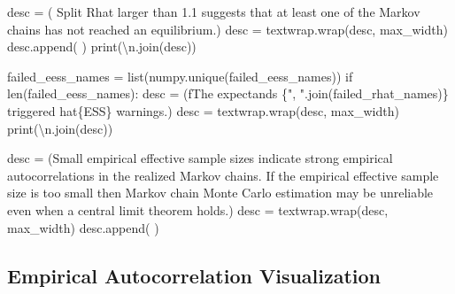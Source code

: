 \documentclass[
  letterpaper,
  DIV=11,
  numbers=noendperiod]{scrartcl}
\newenvironment{Shaded}{\begin{snugshade}}{\end{snugshade}}
\newcommand{\BuiltInTok}[1]{\textcolor[rgb]{0.00,0.23,0.31}{#1}}
\newcommand{\CharTok}[1]{\textcolor[rgb]{0.13,0.47,0.30}{#1}}
\newcommand{\ControlFlowTok}[1]{\textcolor[rgb]{0.00,0.23,0.31}{#1}}
\newcommand{\NormalTok}[1]{\textcolor[rgb]{0.00,0.23,0.31}{#1}}
\newcommand{\OperatorTok}[1]{\textcolor[rgb]{0.37,0.37,0.37}{#1}}
\newcommand{\SpecialCharTok}[1]{\textcolor[rgb]{0.37,0.37,0.37}{#1}}
\newcommand{\SpecialStringTok}[1]{\textcolor[rgb]{0.13,0.47,0.30}{#1}}
\newcommand{\StringTok}[1]{\textcolor[rgb]{0.13,0.47,0.30}{#1}}
\begin{document}
\begin{Shaded}
\begin{Highlighting}[]
\NormalTok{    desc }\OperatorTok{=}\NormalTok{ (}\StringTok{\textquotesingle{}  Split Rhat larger than 1.1 suggests that at \textquotesingle{}}
            \StringTok{\textquotesingle{}least one of the Markov chains has not reached \textquotesingle{}}
            \StringTok{\textquotesingle{}an equilibrium.\textquotesingle{}}\NormalTok{)}
\NormalTok{    desc }\OperatorTok{=}\NormalTok{ textwrap.wrap(desc, max\_width)}
\NormalTok{    desc.append(}\StringTok{\textquotesingle{} \textquotesingle{}}\NormalTok{)}
    \BuiltInTok{print}\NormalTok{(}\StringTok{\textquotesingle{}}\CharTok{\textbackslash{}n}\StringTok{\textquotesingle{}}\NormalTok{.join(desc))}
   
\NormalTok{  failed\_eess\_names }\OperatorTok{=} \BuiltInTok{list}\NormalTok{(numpy.unique(failed\_eess\_names))}
  \ControlFlowTok{if} \BuiltInTok{len}\NormalTok{(failed\_eess\_names):}
\NormalTok{    desc }\OperatorTok{=}\NormalTok{ (}\SpecialStringTok{f\textquotesingle{}The expectands }\SpecialCharTok{\{}\StringTok{", "}\SpecialCharTok{.}\NormalTok{join(failed\_rhat\_names)}\SpecialCharTok{\}}\SpecialStringTok{ \textquotesingle{}}
             \StringTok{\textquotesingle{}triggered hat}\SpecialCharTok{\{ESS\}}\StringTok{ warnings.\textquotesingle{}}\NormalTok{)}
\NormalTok{    desc }\OperatorTok{=}\NormalTok{ textwrap.wrap(desc, max\_width)}
    \BuiltInTok{print}\NormalTok{(}\StringTok{\textquotesingle{}}\CharTok{\textbackslash{}n}\StringTok{\textquotesingle{}}\NormalTok{.join(desc))}
    
\NormalTok{    desc }\OperatorTok{=}\NormalTok{ (}\StringTok{\textquotesingle{}Small empirical effective sample sizes indicate strong \textquotesingle{}}
            \StringTok{\textquotesingle{}empirical autocorrelations in the realized Markov chains. \textquotesingle{}}
            \StringTok{\textquotesingle{}If the empirical effective sample size is too \textquotesingle{}}
            \StringTok{\textquotesingle{}small then Markov chain Monte Carlo estimation \textquotesingle{}}
            \StringTok{\textquotesingle{}may be unreliable even when a central limit \textquotesingle{}}
            \StringTok{\textquotesingle{}theorem holds.\textquotesingle{}}\NormalTok{)}
\NormalTok{    desc }\OperatorTok{=}\NormalTok{ textwrap.wrap(desc, max\_width)}
\NormalTok{    desc.append(}\StringTok{\textquotesingle{} \textquotesingle{}}\NormalTok{)}
\end{Highlighting}
\end{Shaded}

\hypertarget{empirical-autocorrelation-visualization}{%
\subsection{Empirical Autocorrelation
Visualization}\label{empirical-autocorrelation-visualization}}
\end{document}
